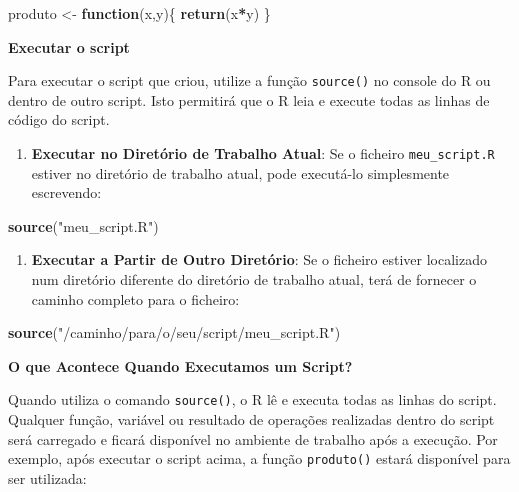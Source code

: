 \documentclass[
]{book}
\newenvironment{Shaded}{\begin{snugshade}}{\end{snugshade}}
\newcommand{\ControlFlowTok}[1]{\textcolor[rgb]{0.13,0.29,0.53}{\textbf{#1}}}
\newcommand{\FunctionTok}[1]{\textcolor[rgb]{0.13,0.29,0.53}{\textbf{#1}}}
\newcommand{\NormalTok}[1]{#1}
\newcommand{\OtherTok}[1]{\textcolor[rgb]{0.56,0.35,0.01}{#1}}
\newcommand{\SpecialCharTok}[1]{\textcolor[rgb]{0.81,0.36,0.00}{\textbf{#1}}}
\newcommand{\StringTok}[1]{\textcolor[rgb]{0.31,0.60,0.02}{#1}}
\providecommand{\tightlist}{%
  \setlength{\itemsep}{0pt}\setlength{\parskip}{0pt}}
\begin{document}
\begin{Shaded}
\begin{Highlighting}[]
\NormalTok{produto }\OtherTok{\textless{}{-}} \ControlFlowTok{function}\NormalTok{(x,y)\{}
  \FunctionTok{return}\NormalTok{(x}\SpecialCharTok{*}\NormalTok{y)}
\NormalTok{\}}
\end{Highlighting}
\end{Shaded}

\textbf{Executar o script}

Para executar o script que criou, utilize a função \texttt{source()} no console
do R ou dentro de outro script. Isto permitirá que o R leia e execute
todas as linhas de código do script.

\begin{enumerate}
\def\labelenumi{\arabic{enumi}.}
\tightlist
\item
  \textbf{Executar no Diretório de Trabalho Atual}: Se o ficheiro
  \texttt{meu\_script.R} estiver no diretório de trabalho atual, pode
  executá-lo simplesmente escrevendo:
\end{enumerate}

\begin{Shaded}
\begin{Highlighting}[]
\FunctionTok{source}\NormalTok{(}\StringTok{"meu\_script.R"}\NormalTok{)}
\end{Highlighting}
\end{Shaded}

\begin{enumerate}
\def\labelenumi{\arabic{enumi}.}
\setcounter{enumi}{1}
\tightlist
\item
  \textbf{Executar a Partir de Outro Diretório}: Se o ficheiro estiver
  localizado num diretório diferente do diretório de trabalho atual,
  terá de fornecer o caminho completo para o ficheiro:
\end{enumerate}

\begin{Shaded}
\begin{Highlighting}[]
\FunctionTok{source}\NormalTok{(}\StringTok{"/caminho/para/o/seu/script/meu\_script.R"}\NormalTok{)}
\end{Highlighting}
\end{Shaded}

\textbf{O que Acontece Quando Executamos um Script?}

Quando utiliza o comando \texttt{source()}, o R lê e executa todas as linhas do
script. Qualquer função, variável ou resultado de operações realizadas
dentro do script será carregado e ficará disponível no ambiente de
trabalho após a execução. Por exemplo, após executar o script acima, a
função \texttt{produto()} estará disponível para ser utilizada:
\end{document}

